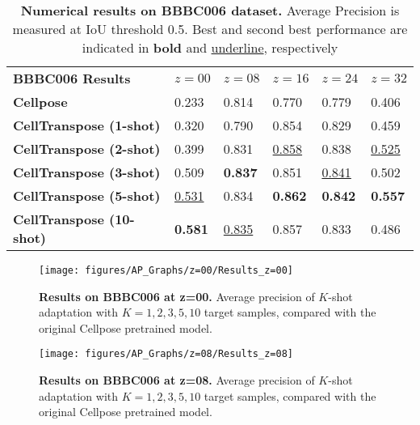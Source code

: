 \setlength{\tabcolsep}{4pt}
\begin{table}
\begin{center}
\caption{\textbf{Numerical results on BBBC006 dataset.} Average Precision is measured at IoU threshold 0.5. Best and second best performance are indicated in \textbf{bold} and \underline{underline}, respectively}
\label{table:bbbc006_quant}
\begin{tabular}{l|lllll}
\hline\noalign{\smallskip}
{\bf BBBC006 Results} & $z=00$ & $z=08$ & $z=16$ & $z=24$ & $z=32$ \\
\noalign{\smallskip}
\hline
\noalign{\smallskip}
{\bf Cellpose} 					& 0.233 & 0.814 & 0.770 & 0.779 & 0.406\\
{\bf CellTranspose (1-shot)} 	& 0.320 & 0.790 & 0.854 & 0.829 & 0.459\\
{\bf CellTranspose (2-shot)} 	& 0.399 & 0.831 & \underline{0.858} & 0.838 & \underline{0.525}\\
{\bf CellTranspose (3-shot)} 	& 0.509 & \textbf{0.837} & 0.851 & \underline{0.841} & 0.502\\
{\bf CellTranspose (5-shot)} 	& \underline{0.531} & 0.834 & \textbf{0.862} & \textbf{0.842} & \textbf{0.557}\\
{\bf CellTranspose (10-shot)} 	& \textbf{0.581} & \underline{0.835} & 0.857 & 0.833 & 0.486\\
\hline
\end{tabular}
\end{center}
\end{table}

\begin{figure*}
\centering
\texttt{[image: figures/AP\_Graphs/z=00/Results\_z=00]}
\caption{\textbf{Results on BBBC006 at z=00.} Average precision of $K$-shot adaptation with $K= 1, 2, 3, 5, 10$ target samples, compared with the original Cellpose pretrained model.}
\label{fig:bbbc_qual_00}
\end{figure*}

\begin{figure*}
\centering
\texttt{[image: figures/AP\_Graphs/z=08/Results\_z=08]}
\caption{\textbf{Results on BBBC006 at z=08.} Average precision of $K$-shot adaptation with $K= 1, 2, 3, 5, 10$ target samples, compared with the original Cellpose pretrained model.}
\label{fig:bbbc_qual_08}
\end{figure*}

